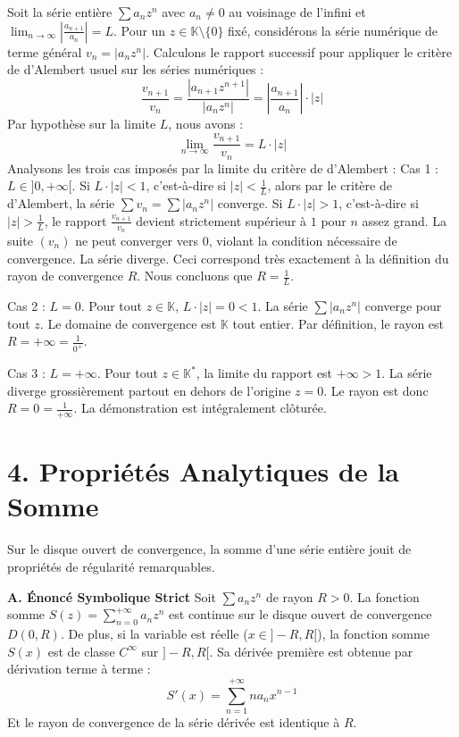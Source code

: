 \documentclass{report}
\begin{document}
Soit la série entière $\sum a_n z^n$ avec $a_n \neq 0$ au voisinage de l'infini et $\lim_{n \to \infty} \left| \frac{a_{n+1}}{a_n} \right| = L$.
Pour un $z \in \mathbb{K} \setminus \{0\}$ fixé, considérons la série numérique de terme général $v_n = |a_n z^n|$.
Calculons le rapport successif pour appliquer le critère de d'Alembert usuel sur les séries numériques :
$$\frac{v_{n+1}}{v_n} = \frac{|a_{n+1} z^{n+1}|}{|a_n z^n|} = \left| \frac{a_{n+1}}{a_n} \right| \cdot |z|$$
Par hypothèse sur la limite $L$, nous avons :
$$\lim_{n \to \infty} \frac{v_{n+1}}{v_n} = L \cdot |z|$$
Analysons les trois cas imposés par la limite du critère de d'Alembert :
Cas 1 : $L \in ]0, +\infty[$.
Si $L \cdot |z| < 1$, c'est-à-dire si $|z| < \frac{1}{L}$, alors par le critère de d'Alembert, la série $\sum v_n = \sum |a_n z^n|$ converge.
Si $L \cdot |z| > 1$, c'est-à-dire si $|z| > \frac{1}{L}$, le rapport $\frac{v_{n+1}}{v_n}$ devient strictement supérieur à $1$ pour $n$ assez grand. La suite $(v_n)$ ne peut converger vers $0$, violant la condition nécessaire de convergence. La série diverge.
Ceci correspond très exactement à la définition du rayon de convergence $R$. Nous concluons que $R = \frac{1}{L}$.

Cas 2 : $L = 0$.
Pour tout $z \in \mathbb{K}$, $L \cdot |z| = 0 < 1$. La série $\sum |a_n z^n|$ converge pour tout $z$. Le domaine de convergence est $\mathbb{K}$ tout entier. Par définition, le rayon est $R = +\infty = \frac{1}{0^+}$.

Cas 3 : $L = +\infty$.
Pour tout $z \in \mathbb{K}^*$, la limite du rapport est $+\infty > 1$. La série diverge grossièrement partout en dehors de l'origine $z=0$. Le rayon est donc $R = 0 = \frac{1}{+\infty}$.
La démonstration est intégralement clôturée.

\section*{4. Propriétés Analytiques de la Somme}

Sur le disque ouvert de convergence, la somme d'une série entière jouit de propriétés de régularité remarquables.

\textbf{A. Énoncé Symbolique Strict}
Soit $\sum a_n z^n$ de rayon $R > 0$. La fonction somme $S(z) = \sum_{n=0}^{+\infty} a_n z^n$ est continue sur le disque ouvert de convergence $D(0, R)$.
De plus, si la variable est réelle ($x \in ]-R, R[$), la fonction somme $S(x)$ est de classe $C^\infty$ sur $]-R, R[$. Sa dérivée première est obtenue par dérivation terme à terme :
$$S'(x) = \sum_{n=1}^{+\infty} n a_n x^{n-1}$$
Et le rayon de convergence de la série dérivée est identique à $R$.
\end{document}
